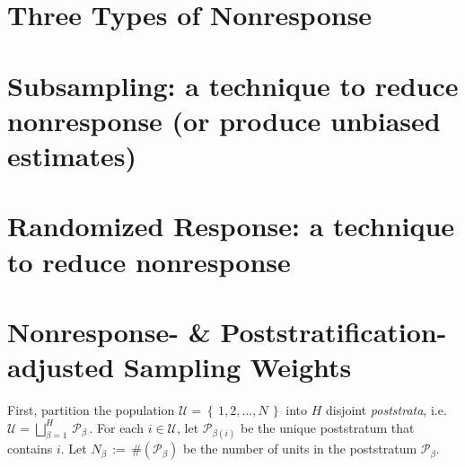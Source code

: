 \documentclass{article}
\begin{document}


\pagestyle{fancy}

%

\lfoot[]{}
\cfoot[]{}
\rfoot[]{\thepage}



\section{Three Types of Nonresponse}
\setcounter{theorem}{0}


\section{Subsampling: a technique to reduce nonresponse (or produce unbiased estimates)}
\setcounter{theorem}{0}


\section{Randomized Response: a technique to reduce nonresponse}
\setcounter{theorem}{0}


\section{Nonresponse- \& Poststratification-adjusted Sampling Weights}
\setcounter{theorem}{0}

First, partition the population $\mathcal{U} = \left\{\,1,2,\ldots,N\,\right\}$ into $H$ disjoint \emph{poststrata}, i.e.\; 
$\mathcal{U} = \displaystyle{\bigsqcup_{\beta=1}^{H}}\,\mathcal{P}_{\beta}$\,.  For each $i \in \mathcal{U}$, let $\mathcal{P}_{\beta(i)}$ be the unique poststratum that contains $i$.  Let $N_{\beta} \,:=\, \#(\mathcal{P}_{\beta})$ be the number of units in the poststratum $\mathcal{P}_{\beta}$.  \\
\end{document}
